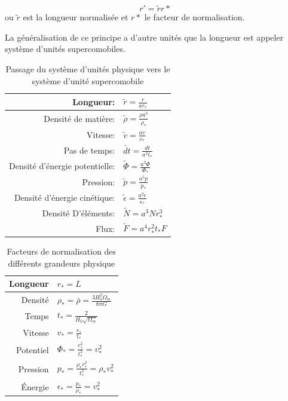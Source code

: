 \begin{equation}
r'=\tilde{r}r*
\end{equation}
ou $\tilde{r}$ est la longueur normalisée et $r*$ le facteur de normalisation.

La généralisation de ce principe a d'autre unités que la longueur est appeler système d'unités supercomobiles.
\citep{martel_convenient_1998}

\begin{table}[htbp]
\begin{center}
\begin{tabular}{r l} \hline 
Longueur: & $\tilde{r}=\frac{r}{ar_*}$ \\ \hline 
Densité de matière: & $\tilde{\rho}=\frac{\rho a^3}{\rho_*}$ \\ \hline 
Vitesse: & $ \tilde{v}=\frac{av}{v_*}$ \\ \hline 
Pas de temps: & $\tilde{dt}=\frac{dt}{a^2t_*}$\\ \hline 
Densité d’énergie potentielle: & $\tilde{\Phi}=\frac{a^2 \Phi}{\Phi_*}$\\ \hline 
Pression: & $\tilde{p}=\frac{a^5 p}{p_*}$\\ \hline 
Densité d’énergie cinétique: & $\tilde{\epsilon}=\frac{a^2 \epsilon}{\epsilon_*}$\\ \hline 
Densité D’éléments: & $\tilde{N}=a^3 N r_*^3$\\ \hline 
Flux: & $\tilde{F}=a^4 r_*^2 t_* F$\\ \hline 
\end{tabular} 
\end{center}
\caption{Passage du système d'unités physique vers le système d'unité supercomobile} 
\end{table}

\begin{table}[htbp]
\begin{center}
\begin{tabular}{r l} \hline 
Longueur  & $r_*=L$\\ \hline 
Densité & $\rho_* = \bar{\rho} = \frac{3H_0^2 \Omega_m}{8\pi G}$\\ \hline 
Temps & $t_* = \frac{2}{H_0 \sqrt{\Omega_m}}$\\ \hline 
Vitesse & $v_* = \frac{r_*}{t_*}$\\ \hline 
Potentiel & $\Phi_* = \frac{r_*^2}{t_*^2} = v_*^2$\\ \hline 
Pression & $p_* = \frac{\rho_* r_*^2}{t_*^2} = \rho_* v_*^2$\\ \hline 
Énergie & $\epsilon_* = \frac{p_*}{\rho_*} = v_*^2$\\ \hline 
\end{tabular} 
\end{center}

\caption{Facteurs de normalisation des différents grandeurs physique} 
\end{table}

